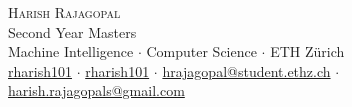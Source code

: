 \newcommand{\sep}{$\cdot$}%
\newcommand{\gmail}{harish.rajagopals@gmail.com}
\newcommand{\ethzmail}{hrajagopal@student.ethz.ch}

\begin{center}

\textsc{\huge Harish Rajagopal}\\[2mm]
Second Year Masters\\[1mm]
Machine Intelligence \sep{} Computer Science \sep{} ETH Zürich\\[1mm]
\faGithub{} \href{https://github.com/rharish101}{rharish101} \sep{}
\faLinkedin{} \href{https://www.linkedin.com/in/rharish101/}{rharish101} \sep{}
\faEnvelope{} \href{mailto:\ethzmail}{\ethzmail} \sep{}
\faEnvelope{} \href{mailto:\gmail}{\gmail}

\end{center}

